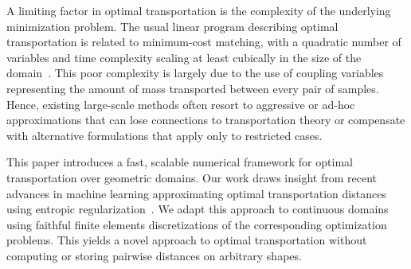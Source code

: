 A limiting factor in optimal transportation is the complexity of the underlying minimization problem. The usual linear program describing optimal transportation is related to minimum-cost matching, with a quadratic number of variables and time complexity scaling at least cubically in the size of the domain~\cite{burkard1999linear}.
This poor complexity is largely due to the use of coupling variables representing the amount of mass transported between every pair of samples. %
Hence, existing large-scale methods often resort to aggressive or ad-hoc approximations that can lose connections to transportation theory or compensate with alternative formulations that apply only to restricted cases.



This paper introduces a fast, scalable numerical framework for optimal transportation over geometric domains.  Our work draws insight from recent advances in machine learning approximating optimal transportation distances using entropic regularization~\cite{cuturi-2013}.  
We adapt this approach to continuous domains using faithful finite elements discretizations of the corresponding optimization problems. This yields a novel approach to optimal transportation without computing or storing pairwise distances on arbitrary shapes.

